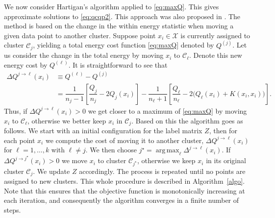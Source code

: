 \documentclass[aps,preprint,nofootinbib,floatfix]{revtex4-1}
\DeclareMathOperator*{\argmax}{arg\,max}
\newcommand\kk{K}
\newcommand\C{{\mathcal{C}}}
\begin{document}
We now consider Hartigan's algorithm \cite{Hartigan} applied to 
\eqref{eq:maxQ}. This gives approximate solutions to 
\eqref{eq:qcqp2}. This approach was also proposed in \cite{Kgroups}.
The method is based on the change
in the within energy statistic when moving a given data point to
another cluster.
Suppose point $x_i \in \mathcal{X}$
is currently assigned to  cluster $\C_j$, yielding
a total energy cost function \eqref{eq:maxQ} denoted by $Q^{(j)}$.
Let us consider the change in the total energy by moving
$x_i$ to $\C_\ell$. 
Denote this new energy cost by $Q^{(\ell)}$.
It is straightforward to see that
\begin{equation}
\label{eq:changeQ}
\begin{split}
\Delta Q^{j \to \ell}(x_i) &\equiv Q^{(\ell)} - Q^{(j)} \\ 
&= 
\dfrac{1}{n_j - 1}\left[ \dfrac{Q_j}{n_j} - 2 Q_j(x_i) \right]
- \dfrac{1}{n_\ell + 1}\left[ \dfrac{Q_\ell}{n_\ell} - 2 \big(Q_\ell(x_i) + 
\kk(x_i,x_i)\big) 
\right].
\end{split}
\end{equation}
Thus, if $\Delta Q^{j\to \ell}(x_i) > 0$ we get closer to a 
maximum of \eqref{eq:maxQ} by
moving $x_i$ to $\C_\ell$, otherwise we better keep $x_i$ in $\C_j$. Based on
this the algorithm goes as follows.
We start with an initial configuration for the label matrix $Z$, 
then for each
point $x_i$ 
we compute the cost of moving it to another cluster,
$\Delta Q^{j\to \ell}(x_i)$ for 
$\ell=1,\dots,k$ with $\ell \ne j$. 
We then choose $j^\star = \argmax_\ell \Delta^{j \to \ell}(x_i)$.
If $\Delta Q^{j \to j^\star}(x_i) > 0$ 
we move $x_i$ to cluster $\C_{j^\star}$, otherwise 
we keep $x_i$ in its original cluster $\C_j$. We update $Z$ accordingly.
The process is repeated
until no points are assigned to new clusters. 
This whole procedure is described in Algorithm~\ref{algo}.
Note that this ensures that the objective function is
monotonically increasing at each iteration, and consequently the algorithm
converges in a finite number of steps.
\end{document}

